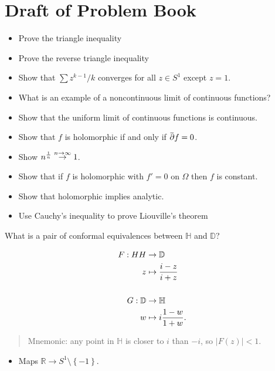 \hypertarget{draft-of-problem-book}{%
\section{Draft of Problem Book}\label{draft-of-problem-book}}

\begin{itemize}
\tightlist
\item
  Prove the triangle inequality
\item
  Prove the reverse triangle inequality
\item
  Show that \(\sum z^{k-1}/k\) converges for all \(z\in S^1\) except
  \(z=1\).
\item
  What is an example of a noncontinuous limit of continuous functions?
\item
  Show that the uniform limit of continuous functions is continuous.
\item
  Show that \(f\) is holomorphic if and only if
  \(\mkern 1.5mu\overline{\mkern-1.5mu{\partial}\mkern-1.5mu}\mkern 1.5muf = 0\).
\item
  Show \(n^{1\over n} \overset{n\to \infty } \to 1\).
\item
  Show that if \(f\) is holomorphic with \(f'=0\) on \(\Omega\) then
  \(f\) is constant.
\item
  Show that holomorphic implies analytic.
\item
  Use Cauchy's inequality to prove Liouville's theorem
\end{itemize}

\begin{problem}[?]

What is a pair of conformal equivalences between \({\mathbb{H}}\) and
\({\mathbb{D}}\)?

\begin{solution}

\begin{align*}
F: HH &\to {\mathbb{D}}\\
z & \mapsto {i-z \over i+z}
\\
\\
G: {\mathbb{D}}&\to {\mathbb{H}}\\
w &\mapsto i{1-w \over 1 + w}
.\end{align*}

\begin{quote}
Mnemonic: any point in \({\mathbb{H}}\) is closer to \(i\) than \(-i\),
so \({\left\lvert {F(z)} \right\rvert} < 1\).
\end{quote}

\begin{itemize}
\tightlist
\item
  Maps \({\mathbb{R}}\to S^1\setminus\left\{{-1}\right\}\).
\end{itemize}

\end{solution}

\end{problem}

